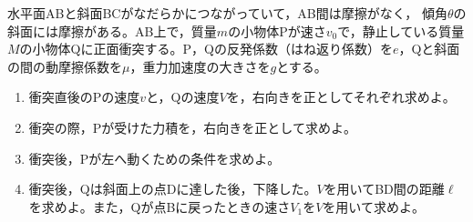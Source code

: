 \item
    \begin{mawarikomi}{190pt}{}
    水平面ABと斜面BCがなだらかにつながっていて，AB間は摩擦がなく，
    傾角$\theta $の斜面には摩擦がある。AB上で，質量$m$の小物体Pが速さ$v_0$で，静止している質量$M$の小物体Qに正面衝突する。P，Qの反発係数（はね返り係数）を$e$，Qと斜面の間の動摩擦係数を$\mu $，重力加速度の大きさを$g$とする。
        \begin{enumerate}
            \item 衝突直後のPの速度$v$と，Qの速度$V$を，右向きを正としてそれぞれ求めよ。
            \item 衝突の際，Pが受けた力積を，右向きを正として求めよ。
            \item 衝突後，Pが左へ動くための条件を求めよ。
            \item 衝突後，Qは斜面上の点Dに達した後，下降した。$V$を用いてBD間の距離$\ell $を求めよ。また，Qが点Bに戻ったときの速さ$V_1$を$V$を用いて求めよ。
        \end{enumerate}
    \end{mawarikomi}